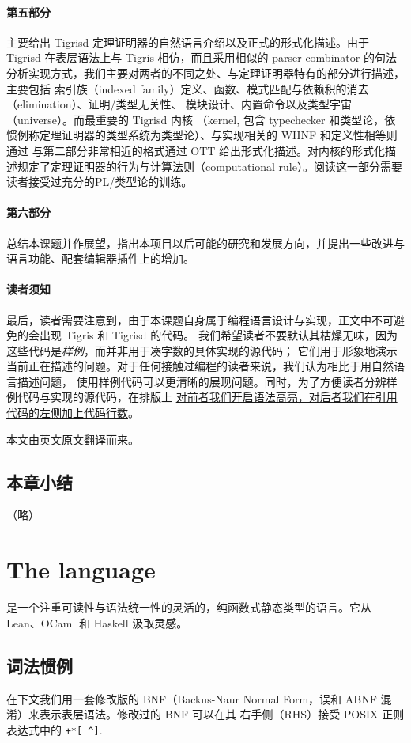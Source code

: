 \documentclass[a4paper, 11pt]{article}
\theoremstyle{remark}\newtheorem*{remark}{Remark}
\theoremstyle{definition}\newtheorem*{definition}{Definition}
\begin{document}
\paragraph{第五部分}主要给出 Tigrisd 定理证明器的自然语言介绍以及正式的形式化描述。由于 Tigrisd 在表层语法上与 Tigris 相仿，而且采用相似的
parser combinator 的句法分析实现方式，我们主要对两者的不同之处、与定理证明器特有的部分进行描述，主要包括
索引族（indexed family）定义、函数、模式匹配与依赖积的消去（elimination）、证明/类型无关性、
模块设计、内置命令以及类型宇宙（universe）。而最重要的 Tigrisd 内核
（kernel, 包含 typechecker 和类型论，依惯例称定理证明器的类型系统为类型论）、与实现相关的 WHNF 和定义性相等则通过
与第二部分非常相近的格式通过 OTT 给出形式化描述。对内核的形式化描述规定了定理证明器的行为与计算法则（computational rule）。阅读这一部分需要读者接受过充分的PL/类型论的训练。

\paragraph{第六部分}总结本课题并作展望，指出本项目以后可能的研究和发展方向，并提出一些改进与语言功能、配套编辑器插件上的增加。

\paragraph{读者须知} 最后，读者需要注意到，由于本课题自身属于编程语言设计与实现，正文中不可避免的会出现 Tigris 和 Tigrisd 的代码。
我们希望读者不要默认其枯燥无味，因为这些代码是\emph{样例}，而并非用于凑字数的具体实现的源代码；
它们用于形象地演示当前正在描述的问题。对于任何接触过编程的读者来说，我们认为相比于用自然语言描述问题，
使用样例代码可以更清晰的展现问题。同时，为了方便读者分辨样例代码与实现的源代码，在排版上
\underline{对前者我们开启语法高亮，对后者我们在引用代码的左侧加上代码行数}。

本文由英文原文翻译而来。

\subsection{本章小结}
（略）

\section{The \Tigris language}
\Tigris 是一个注重可读性与语法统一性的灵活的，纯函数式静态类型的语言。它从 Lean、OCaml 和 Haskell 汲取灵感。

\subsection{词法惯例}
在下文我们用一套修改版的 BNF（Backus-Naur Normal Form，误和 ABNF 混淆）来表示表层语法。修改过的 BNF 可以在其
右手侧（RHS）接受 POSIX 正则表达式中的 \texttt{+*[\,\^\;]}.
\end{document}
